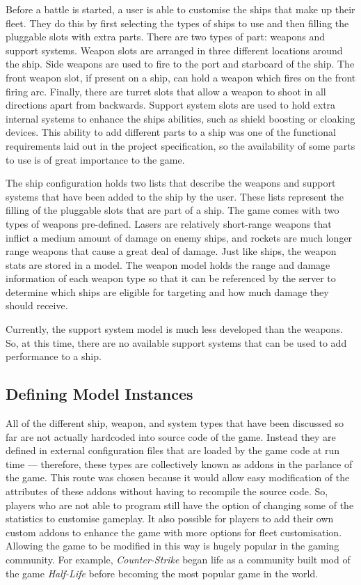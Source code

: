 Before a battle is started, a user is able to customise the ships that make up their fleet. They do this by first selecting the types of ships to use and then filling the pluggable slots with extra parts. There are two types of part: weapons and support systems. Weapon slots are arranged in three different locations around the ship. Side weapons are used to fire to the port and starboard of the ship. The front weapon slot, if present on a ship, can hold a weapon which fires on the front firing arc. Finally, there are turret slots that allow a weapon to shoot in all directions apart from backwards. Support system slots are used to hold extra internal systems to enhance the ships abilities, such as shield boosting or cloaking devices. This ability to add different parts to a ship was one of the functional requirements laid out in the project specification, so the availability of some parts to use is of great importance to the game.

The ship configuration holds two lists that describe the weapons and support systems that have been added to the ship by the user. These lists represent the filling of the pluggable slots that are part of a ship. The game comes with two types of weapons pre-defined. Lasers are relatively short-range weapons that inflict a medium amount of damage on enemy ships, and rockets are much longer range weapons that cause a great deal of damage. Just like ships, the weapon stats are stored in a model. The weapon model holds the range and damage information of each weapon type so that it can be referenced by the server to determine which ships are eligible for targeting and how much damage they should receive.

Currently, the support system model is much less developed than the weapons. So, at this time, there are no available support systems that can be used to add performance to a ship.

\subsection{Defining Model Instances}

All of the different ship, weapon, and system types that have been discussed so far are not actually hardcoded into source code of the game. Instead they are defined in external configuration files that are loaded by the game code at run time --- therefore, these types are collectively known as addons in the parlance of the game. This route was chosen because it would allow easy modification of the attributes of these addons without having to recompile the source code. So, players who are not able to program still have the option of changing some of the statistics to customise gameplay. It also possible for players to add their own custom addons to enhance the game with more options for fleet customisation. Allowing the game to be modified in this way is hugely popular in the gaming community. For example, \emph{Counter-Strike} began life as a community built mod of the game \emph{Half-Life} before becoming the most popular game in the world.\cite{lambdageneration2012}


